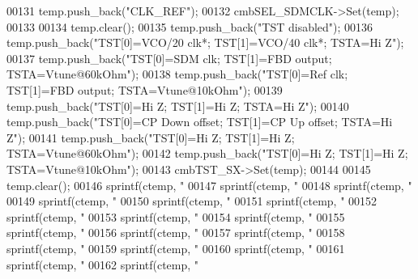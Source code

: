 \begin{DoxyCode}
{{{{{{00131     temp.push\_back(\textcolor{stringliteral}{"CLK\_REF"});
00132     cmbSEL_SDMCLK->Set(temp);
00133 
00134     temp.clear();
00135     temp.push\_back(\textcolor{stringliteral}{"TST disabled"});
00136     temp.push\_back(\textcolor{stringliteral}{"TST[0]=VCO/20 clk*; TST[1]=VCO/40 clk*; TSTA=Hi Z"});
00137     temp.push\_back(\textcolor{stringliteral}{"TST[0]=SDM clk; TST[1]=FBD output; TSTA=Vtune@60kOhm"});
00138     temp.push\_back(\textcolor{stringliteral}{"TST[0]=Ref clk; TST[1]=FBD output; TSTA=Vtune@10kOhm"});
00139     temp.push\_back(\textcolor{stringliteral}{"TST[0]=Hi Z; TST[1]=Hi Z; TSTA=Hi Z"});
00140     temp.push\_back(\textcolor{stringliteral}{"TST[0]=CP Down offset; TST[1]=CP Up offset; TSTA=Hi Z"});
00141     temp.push\_back(\textcolor{stringliteral}{"TST[0]=Hi Z; TST[1]=Hi Z; TSTA=Vtune@60kOhm"});
00142     temp.push\_back(\textcolor{stringliteral}{"TST[0]=Hi Z; TST[1]=Hi Z; TSTA=Vtune@10kOhm"});
00143     cmbTST_SX->Set(temp);
00144 
00145     temp.clear();
00146     sprintf(ctemp, \textcolor{stringliteral}{"%
00147     sprintf(ctemp, \textcolor{stringliteral}{"%
00148     sprintf(ctemp, \textcolor{stringliteral}{"%
00149     sprintf(ctemp, \textcolor{stringliteral}{"%
00150     sprintf(ctemp, \textcolor{stringliteral}{"%
00151     sprintf(ctemp, \textcolor{stringliteral}{"%
00152     sprintf(ctemp, \textcolor{stringliteral}{"%
00153     sprintf(ctemp, \textcolor{stringliteral}{"%
00154     sprintf(ctemp, \textcolor{stringliteral}{"%
00155     sprintf(ctemp, \textcolor{stringliteral}{"%
00156     sprintf(ctemp, \textcolor{stringliteral}{"%
00157     sprintf(ctemp, \textcolor{stringliteral}{"%
00158     sprintf(ctemp, \textcolor{stringliteral}{"%
00159     sprintf(ctemp, \textcolor{stringliteral}{"%
00160     sprintf(ctemp, \textcolor{stringliteral}{"%
00161     sprintf(ctemp, \textcolor{stringliteral}{"%
00162     sprintf(ctemp, \textcolor{stringliteral}{"%
}}}}}}}}}}}}}}}}}}}}}}}
\end{DoxyCode}
